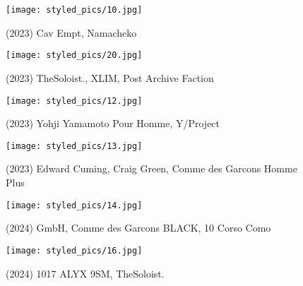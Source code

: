 \begin{minipage}[h!]{0.5\textwidth}
    \begin{figure}[H]
        \texttt{[image: styled\_pics/10.jpg]}
        \caption*{(2023) Cav Empt, Namacheko}
    \end{figure}
\end{minipage}
\begin{minipage}[h!]{0.5\textwidth}
    \begin{figure}[H]
        \texttt{[image: styled\_pics/20.jpg]}
        \caption*{(2023) TheSoloist., XLIM, Post Archive Faction}
    \end{figure}
\end{minipage}
\begin{minipage}[h!]{0.5\textwidth}
    \begin{figure}[H]
        \texttt{[image: styled\_pics/12.jpg]}
        \caption*{(2023) Yohji Yamamoto Pour Homme, Y/Project}
    \end{figure}
\end{minipage}
\begin{minipage}[h!]{0.5\textwidth}
    \begin{figure}[H]
        \texttt{[image: styled\_pics/13.jpg]}
        \caption*{(2023) Edward Cuming, Craig Green, Comme des Garcons Homme Plus}
    \end{figure}
\end{minipage}
\begin{minipage}[h!]{0.5\textwidth}
    \begin{figure}[H]
        \texttt{[image: styled\_pics/14.jpg]}
        \caption*{(2024) GmbH, Comme des Garcons BLACK, 10 Corso Como}
    \end{figure}
\end{minipage}
\begin{minipage}[h!]{0.5\textwidth}
    \begin{figure}[H]
        \texttt{[image: styled\_pics/16.jpg]}
        \caption*{(2024) 1017 ALYX 9SM, TheSoloist.}
    \end{figure}
\end{minipage}